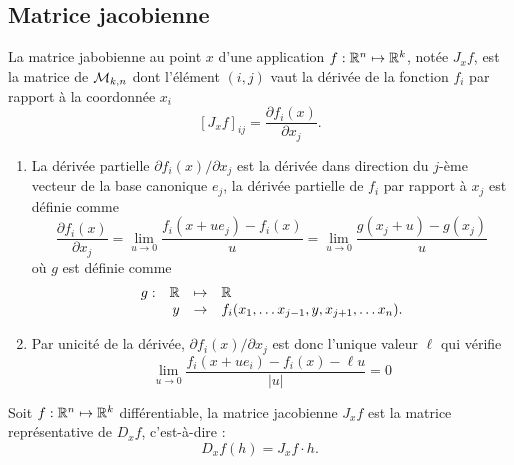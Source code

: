 \subsection{Matrice jacobienne} 

\begin{definition} \label{def:matriceJacobienne}
  La matrice jabobienne au point $x$ d'une application $f : \mathbb{R}^n \mapsto \mathbb{R}^k$, notée $J_xf$, est la matrice de $\mathcal{M}_{k, n}$ dont l'élément $(i, j)$ vaut la dérivée de la fonction $f_i$ par rapport à la coordonnée $x_i$
  $$
  [J_xf]_{ij} 
  = \frac{\partial f_i(x)}{\partial x_j}.
  $$
\end{definition}

\remark
\begin{enumerate}
  \item La dérivée partielle $\partial f_i(x) / \partial x_j$ est la dérivée dans direction du $j$-ème vecteur de la base canonique $e_j$, 
  la dérivée partielle de $f_i$ par rapport à $x_j$ est définie comme
  $$
  \frac{\partial f_i(x)}{\partial x_j} 
  = \lim_{u \to 0} \frac{f_i(x + u e_j) - f_i(x)}{u}
  = \lim_{u \to 0} \frac{g(x_j + u) - g(x_j)}{u}
  $$
  où $g$ est définie comme
  $$
  \begin{array}{rrcl}
    g : & \mathbb{R} & \mapsto & \mathbb{R} \\
    & y & \to & f_i(x_1, \dots x_{j-1}, y, x_{j+1}, \dots x_n).
  \end{array}
  $$
  \item Par unicité de la dérivée, $\partial f_i(x) / \partial x_j$ est donc l'unique valeur $\ell$ qui vérifie
  \begin{equation} \label{eq:caracDeriveePartielle}
    \lim_{u \to 0} \frac{f_i(x + u e_i) - f_i(x) - \ell u}{|u|} = 0
  \end{equation}
\end{enumerate}

\begin{proposition} \label{prop:matriceJacobienne}
  Soit $f : \mathbb{R}^n \mapsto \mathbb{R}^k$ différentiable, la matrice jacobienne $J_xf$ est la matrice représentative de $D_xf$, c'est-à-dire :
  $$
  D_xf(h) = J_xf \cdot h.
  $$
\end{proposition}

